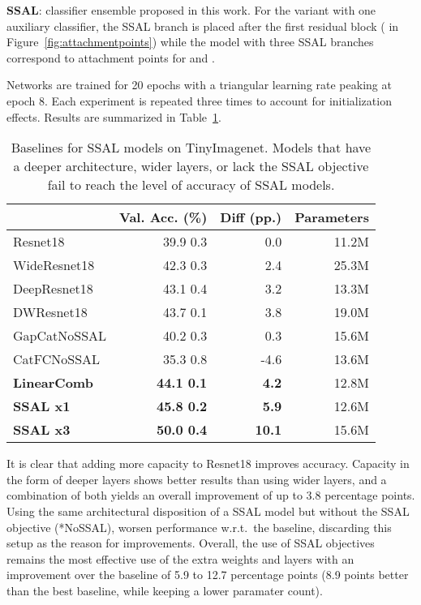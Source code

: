 \documentclass[10pt,twocolumn,letterpaper]{article}
\begin{document}
\textbf{SSAL}: classifier ensemble proposed in this work.
For the variant with one auxiliary classifier, the SSAL branch is placed after the first residual block ( in Figure~\ref{fig:attachmentpoints}) while the model with three SSAL branches correspond to attachment points for  and .

Networks are trained for 20 epochs with a triangular learning rate peaking at epoch 8.
Each experiment is repeated three times to account for initialization effects.
Results are summarized in Table~\ref{tab:baselines}.

\begin{table}[t]
\centering
\begin{tabular}{@{}lrrr@{}}
\toprule
                 & Val. Acc. (\%)         & Diff (pp.)     & Parameters        \\ \midrule
Resnet18         & 39.9  0.3          & 0.0           & 11.2M             \\
WideResnet18     & 42.3  0.3          & 2.4           & 25.3M             \\
DeepResnet18     & 43.1  0.4          & 3.2           & 13.3M             \\
DWResnet18       & 43.7  0.1          & 3.8           & 19.0M             \\ \midrule
GapCatNoSSAL     & 40.2  0.3          & 0.3           & 15.6M             \\
CatFCNoSSAL      & 35.3  0.8          & -4.6          & 13.6M             \\ \midrule
\textbf{LinearComb}  & \textbf{44.1  0.1} & \textbf{4.2}  & 12.8M             \\
\textbf{SSAL x1} & \textbf{45.8  0.2} & \textbf{5.9}  & 12.6M             \\
\textbf{SSAL x3} & \textbf{50.0  0.4} & \textbf{10.1} & 15.6M             \\ \bottomrule
\end{tabular}
\caption{Baselines for SSAL models on TinyImagenet. Models that have a deeper architecture, wider layers, or lack the SSAL objective fail to reach the level of accuracy of SSAL models.}
\label{tab:baselines}
\end{table}

It is clear that adding more capacity to Resnet18 improves accuracy.
Capacity in the form of deeper layers shows better results than using wider layers, and a combination of both yields an overall improvement of up to 3.8 percentage points.
Using the same architectural disposition of a SSAL model but without the SSAL objective (*NoSSAL), worsen performance w.r.t.~the baseline, discarding this setup as the reason for improvements.
Overall, the use of SSAL objectives remains the most effective use of the extra weights and layers with an improvement over the baseline of 5.9 to 12.7 percentage points (8.9 points better than the best baseline, while keeping a lower paramater count).
\end{document}

